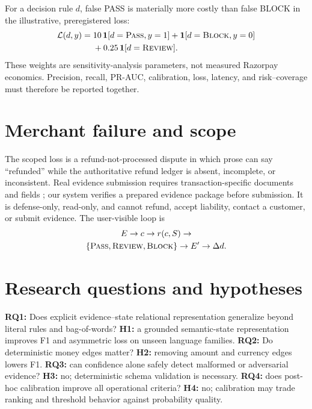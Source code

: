 \documentclass[10pt,twocolumn]{article}
\newcommand{\pass}{\textsc{Pass}}
\newcommand{\review}{\textsc{Review}}
\newcommand{\block}{\textsc{Block}}
\begin{document}
For a decision rule $d$, false PASS is materially more costly than false BLOCK in the illustrative, preregistered loss:
\begin{align}
 \mathcal{L}(d,y)={}&10\,\mathbf{1}[d=\pass,y=1]
 +\mathbf{1}[d=\block,y=0]\nonumber\\
 &+0.25\,\mathbf{1}[d=\review].
\end{align}
These weights are sensitivity-analysis parameters, not measured Razorpay economics. Precision, recall, PR-AUC, calibration, loss, latency, and risk--coverage must therefore be reported together.

\section{Merchant failure and scope}
The scoped loss is a refund-not-processed dispute in which prose can say ``refunded'' while the authoritative refund ledger is absent, incomplete, or inconsistent. Real evidence submission requires transaction-specific documents and fields \cite{razorpay2026disputes}; our system verifies a prepared evidence package before submission. It is defense-only, read-only, and cannot refund, accept liability, contact a customer, or submit evidence. The user-visible loop is
\begin{multline*}
E\rightarrow c\rightarrow r(c,S)\rightarrow\\
\{\pass,\review,\block\}\rightarrow E'\rightarrow\Delta d.
\end{multline*}

\section{Research questions and hypotheses}
\textbf{RQ1:} Does explicit evidence--state relational representation generalize beyond literal rules and bag-of-words? \textbf{H1:} a grounded semantic-state representation improves F1 and asymmetric loss on unseen language families. \textbf{RQ2:} Do deterministic money edges matter? \textbf{H2:} removing amount and currency edges lowers F1. \textbf{RQ3:} can confidence alone safely detect malformed or adversarial evidence? \textbf{H3:} no; deterministic schema validation is necessary. \textbf{RQ4:} does post-hoc calibration improve all operational criteria? \textbf{H4:} no; calibration may trade ranking and threshold behavior against probability quality.
\end{document}
